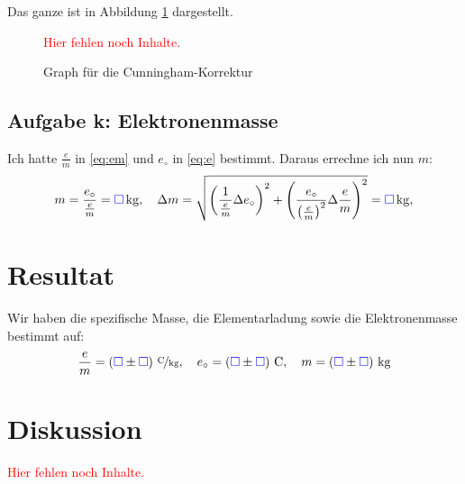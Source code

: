 \documentclass[11pt]{article}
\newcommand{\emesswert}{\left(\messwert \pm \messwert \right)}
\newcommand{\fehlt}{\textcolor{red}{Hier fehlen noch Inhalte.}}
\newcommand{\messwert}{\textcolor{blue}{\square}}
\begin{document}
Das ganze ist in Abbildung \ref{fig:cunningham} dargestellt.

\begin{figure}[h!]
	\centering
	\fehlt
	\caption{Graph für die Cunningham-Korrektur}
	\label{fig:cunningham}
\end{figure}

\subsection{Aufgabe k: Elektronenmasse}

Ich hatte $\frac em$ in \eqref{eq:em} und $e_\circ$ in \eqref{eq:e} bestimmt.
Daraus errechne ich nun $m$:
\[
	m = \frac{e_\circ}{\frac em} = \unit[\messwert]{kg},
	\quad
	\Delta m = \sqrt{
		\left(\frac{1}{\frac em} \Delta e_\circ \right)^2
		+ \left( \frac{e_\circ}{\left( \frac em \right)^2} \Delta \frac em \right)^2
	}
	= \unit[\messwert]{kg},
\]


\section{Resultat}

Wir haben die spezifische Masse, die Elementarladung sowie die Elektronenmasse
bestimmt auf:
\[
	\frac em = \unitfrac[\emesswert]C{kg}
	, \quad
	e_\circ = \unit[\emesswert]C
	, \quad
	m = \unit[\emesswert]{kg}
\]



\section{Diskussion}

\fehlt
\end{document}
